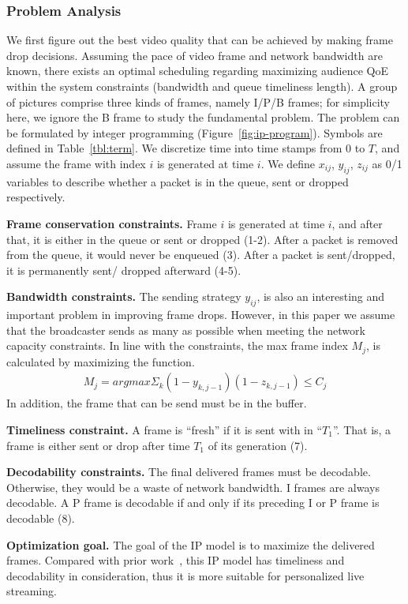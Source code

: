 \subsubsection{Problem Analysis}


We first figure out the best video quality that can be achieved by making frame drop decisions.
Assuming the pace of video frame and network bandwidth are known, there exists an optimal scheduling regarding maximizing audience QoE within the system constraints (bandwidth and queue timeliness length). A group of pictures comprise three kinds of frames, namely I/P/B frames; for simplicity here, we ignore the B frame to study the fundamental problem. The problem can be formulated by integer programming (Figure~\ref{fig:ip-program}). Symbols are defined in Table~\ref{tbl:term}. We discretize time into time stamps from $0$ to $T$, and assume the frame with index $i$ is generated at time $i$. We define $x_{ij}$, $y_{ij}$, $z_{ij}$ as 0/1 variables to describe whether a packet is in the queue, sent or dropped respectively.

\textbf{Frame conservation constraints.}
Frame $i$ is generated at time $i$, and after that, it is either in the queue or sent or dropped (1-2).
After a packet is removed from the queue, it would never be enqueued (3).
After a packet is sent/dropped, it is permanently sent/ dropped afterward (4-5).

\textbf{Bandwidth constraints.}
The sending strategy $y_{ij}$, is also an interesting and important problem in improving frame drops. However, in this paper we assume that the broadcaster sends as many as possible when meeting the network capacity constraints. In line with the constraints, the max frame index $M_{j}$, is calculated by maximizing the function.
\begin{align}
M_j = argmax \Sigma_k (1-y_{k,j-1})(1-z_{k,j-1}) \leq C_{j}
\end{align}
In addition, the frame that can be send must be in the buffer.

\textbf{Timeliness constraint.}
A frame is ``fresh'' if it is sent with in ``$T_1$''. That is, a frame is either sent or drop after time $T_1$ of its generation (7).

\textbf{Decodability constraints.} The final delivered frames must be decodable. Otherwise, they would be a waste of network bandwidth. I frames are always decodable. A P frame is decodable if and only if its preceding I or P frame is decodable (8).

\textbf{Optimization goal.} The goal of the IP model is to maximize the delivered frames.
Compared with prior work~\cite{singh2004dynamic}, this IP model has timeliness and decodability in consideration, thus it is more suitable for personalized live streaming.


